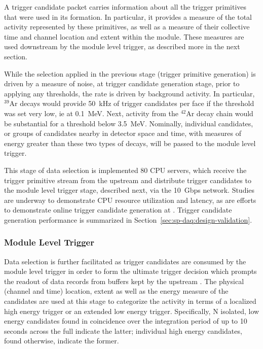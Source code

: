 A trigger candidate packet carries information about all the trigger
primitives that were used in its formation. 
In particular, it provides a measure of the total activity represented
by these primitives, as well as a measure of their collective time and channel
location and extent within the module.
These measures are used downstream by the module level trigger, 
as described more in the next section.

While the selection applied in the previous stage (trigger primitive
generation) is driven by a measure of noise, at trigger candidate
generation stage, prior to applying any thresholds, the rate is driven by
background activity.  
In particular, $^{39}$Ar decays would provide \SI{50}{\kilo\hertz} of
trigger candidates per  face if the threshold was set very low, ie at
\SI{0.1}{\MeV}.
Next, activity from the $^{42}$Ar decay chain would be substantial for a
threshold below \SI{3.5}{\MeV}.
Nominally, individual candidates, or groups of candidates nearby in
detector space and time, with measures of energy greater than these two
types of decays, will be passed to the module level trigger. 

This stage of data selection is implemented 80  CPU servers, which receive the trigger primitive
stream from the upstream  and distribute trigger candidates to the module level trigger
stage, described next, via the \SI{10}{Gbps}  network. Studies are underway to demonstrate CPU
resource utilization and latency, as are efforts to demonstrate online trigger candidate generation
at . Trigger candidate generation performance is summarized in
Section~\ref{sec:sp-daq:design-validation}. 



\subsubsection{Module Level Trigger}
\label{sec:daq:mlt}

Data selection is further facilitated as trigger candidates are consumed
by the module level trigger in order to form the ultimate trigger
decision which prompts the readout of data records from buffers kept by the upstream . 
The physical (channel and time) location, extent as well as the energy measure of the
candidates are used at this stage to categorize the activity in terms
of a localized high energy trigger or an extended low energy trigger. 
Specifically, N isolated, low energy candidates found in coincidence
over the integration period of up to 10 seconds across the full 
indicate the latter; individual high energy candidates, found
otherwise, indicate the former.

